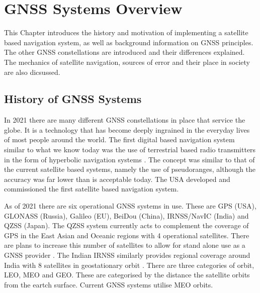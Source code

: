 
\chapter{GNSS Systems Overview} %

\label{Chapter2} %

This Chapter introduces the history and motivation of implementing a satellite based navigation system, as well as background information on GNSS principles. The other
GNSS constellations are introduced and their differences explained. The mechanics of satellite navigation, sources of error and their place in society are also dicsussed. 


\section{History of GNSS Systems} \label{sec:GNSSHistory}
In 2021 there are many different GNSS constellations in place that service the globe. It is a technology that has become deeply ingrained in the everyday lives of most
people around the world. The first digital based navigation system similar to what we know today was the use of terrestrial based radio transmitters in the form of
hyperbolic navigation systems \cite{RN68}. The concept was
similar to that of the current satellite based systems, namely the use of pseudoranges, although the accuracy was far lower than is acceptable today. The USA developed
and commissioned the first satellite based navigation system.

As of 2021 there are six operational GNSS systems in use. These are GPS (USA), GLONASS (Russia), Galileo (EU), BeiDou (China), IRNSS/NavIC (India) and QZSS (Japan). The
QZSS system currently acts to complement the coverage of GPS in the East Asian and Oceanic regions with 4 operational satellites. There are plans to increase this number
of satellites to allow for stand alone use as a GNSS provider \cite{RN47}. The Indian IRNSS similarly provides regional coverage around India with 8 satellites in
geostationary orbit \cite{RN55} . There are three categories of orbit, LEO, MEO and GEO. These are categorised by the distance the satellite orbits from the eartch surface.
Current GNSS systems utilise MEO orbits.

